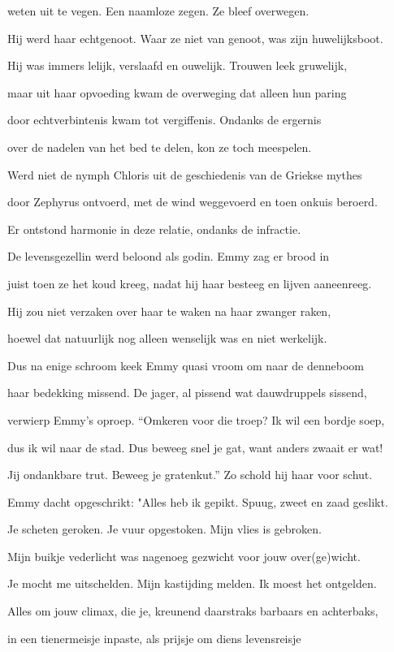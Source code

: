 weten uit te vegen.
Een naamloze zegen.
Ze bleef overwegen.

Hij werd haar echtgenoot.
Waar ze niet van genoot,
was zijn huwelijksboot.

Hij was immers lelijk,
verslaafd en ouwelijk.
Trouwen leek gruwelijk,

maar uit haar opvoeding
kwam de overweging
dat alleen hun paring

door echtverbintenis
kwam tot vergiffenis.
Ondanks de ergernis

over de nadelen
van het bed te delen,
kon ze toch meespelen.

Werd niet de nymph Chloris
uit de geschiedenis
van de Griekse mythes

door Zephyrus ontvoerd,
met de wind weggevoerd
en toen onkuis beroerd.

Er ontstond harmonie
in deze relatie,
ondanks de infractie.

De levensgezellin
werd beloond als godin.
Emmy zag er brood in

juist toen ze het koud kreeg,
nadat hij haar besteeg
en lijven aaneenreeg.

Hij zou niet verzaken
over haar te waken
na haar zwanger raken,

hoewel dat natuurlijk
nog alleen wenselijk
was en niet werkelijk.

Dus na enige schroom
keek Emmy quasi vroom
om naar de denneboom

haar bedekking missend.
De jager, al pissend
wat dauwdruppels sissend,

verwierp Emmy’s oproep. “Omkeren voor die troep?
Ik wil een bordje soep,

dus ik wil naar de stad.
Dus beweeg snel je gat,
want anders zwaait er wat!

Jij ondankbare trut.
Beweeg je gratenkut.”
Zo schold hij haar voor schut.

Emmy dacht opgeschrikt:
"Alles heb ik gepikt.
Spuug, zweet en zaad geslikt.

Je scheten geroken.
Je vuur opgestoken.
Mijn vlies is gebroken.

Mijn buikje vederlicht
was nagenoeg gezwicht
voor jouw over(ge)wicht.

Je mocht me uitschelden.
Mijn kastijding melden.
Ik moest het ontgelden.

Alles om jouw climax,
die je, kreunend daarstraks
barbaars en achterbaks,

in een tienermeisje
inpaste, als prijsje
om diens levensreisje

